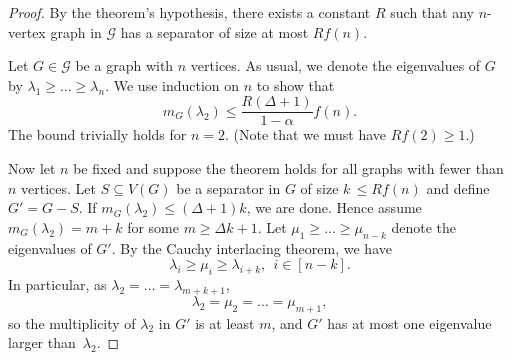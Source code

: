 \begin{proof}
    By the theorem's hypothesis, there exists a constant $R$ such that any $n$-vertex graph in $\mathcal{G}$ has a separator of size at most $R f(n)$.
    
    Let $G \in \mathcal G$ be a graph with $n$ vertices.
    As usual, we denote the eigenvalues of $G$ by $\lambda_1 \ge \dots \ge \lambda_n$.
    We use induction on $n$ to show that 
    \begin{equation*}
        m_G (\lambda_2) \le \frac{R(\Delta + 1)}{1 - \alpha} f(n).
    \end{equation*}    
    The bound trivially holds for $n = 2$.
    (Note that we must have $Rf(2) \ge 1$.)%
    
    Now let $n$ be fixed and suppose the theorem holds for all graphs with fewer than $n$ vertices. 
    Let $S \subseteq V(G)$ be a separator in $G$ of size $k\, \le R f(n)$ and define $G' = G - S$.
    If $m_G (\lambda_2) \le (\Delta + 1)k$, we are done. 
    Hence assume $m_G (\lambda_2) = m + k$ for some $m \ge \Delta k + 1$.
    Let $\mu_1 \ge \dots \ge \mu_{n - k}$ denote the eigenvalues of $G'$.
    By the Cauchy interlacing theorem, we have 
    \begin{equation*}
        \lambda_i \ge \mu_i \ge \lambda_{i + k}, \ \ i \in [n - k].
    \end{equation*}
    In particular, as $\lambda_2 = \dots = \lambda_{m + k + 1}$,
    \begin{equation*}
        \lambda_2 = \mu_2 = \dots = \mu_{m + 1},
    \end{equation*}
    so the multiplicity of $\lambda_2$ in $G'$ is at least $m$, and $G'$ has at most one eigenvalue larger \mbox{than $\lambda_2$}.
    

\end{proof}
